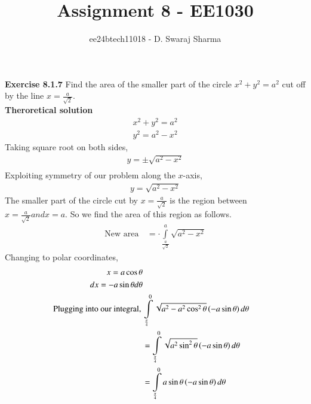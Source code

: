 \documentclass[journal]{IEEEtran}
\begin{document}

\vspace{3cm}

\title{Assignment 8 - EE1030}
\author{ee24btech11018 - D. Swaraj Sharma}

{\let\newpage\relax\maketitle}
\renewcommand{\thefigure}{\theenumi}
\renewcommand{\thetable}{\theenumi}
\setlength{\intextsep}{10pt}
\renewcommand{\thetable}{\theenumi}

\textbf{Exercise 8.1.7} Find the area of the smaller part of the circle $x^2+y^2=a^2$ cut off by the line $x=\frac{a}{\sqrt{2}}$.\\
\textbf{Theroretical solution}
\begin{align}
	x^2+y^2=a^2\\
	y^2=a^2-x^2
\end{align}
Taking square root on both sides,
\begin{align}
	y = \pm\sqrt{a^2-x^2}\\
\end{align}
Exploiting symmetry of our problem along the $x$-axis,
\begin{align}
	y = \sqrt{a^2-x^2} \label{eq1}
\end{align}
The smaller part of the circle cut by $x=\frac{a}{\sqrt{2}}$ is the region between $x=\frac{a}{\sqrt{2}} and x = a$. So we find the area of this region as follows.
\begin{align}
	\text{New area}\, &= \cdot\int\limits_{\frac{a}{\sqrt{2}}}^{a} \sqrt{a^2-x^2}
\end{align}
Changing to polar coordinates,
\begin{align}
	x = a \cos\theta\\
	dx = - a \sin\theta d\theta\\
	\text{Plugging into our integral,}\, &\int\limits_{\frac{\pi}{4}}^{0} \sqrt{a^2-a^2 \cos^2\theta} \left(-a \sin\theta\right) d\theta\\
	&= \int\limits_{\frac{\pi}{4}}^{0} \sqrt{a^2 \sin^2\theta} \left(-a \sin\theta\right) d\theta\\
	&= \int\limits_{\frac{\pi}{4}}^{0} a \sin\theta \left(-a \sin\theta\right) d\theta\\
\end{align}
\end{document}
